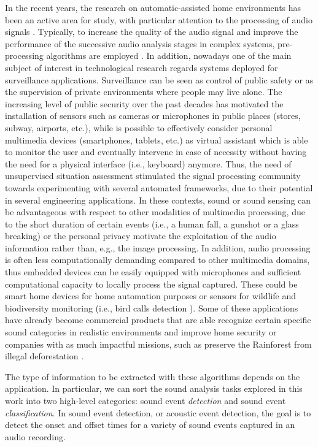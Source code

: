 In the recent years, the research on automatic-assisted home environments has been an active area for study, with particular attention to the processing of audio signals \cite{Gemmeke13,Vacher2015,Principi2015a}. Typically, to increase the quality of the audio signal and improve the performance of the successive audio analysis stages in complex systems, pre-processing algorithms are employed \cite{loizou2013speech,Hussain2007,Rotili12b}. In addition, nowadays one of the main subject of interest in technological research regards systems deployed for surveillance applications. Surveillance can be seen as control of public safety or as the supervision of private environments where people may live alone.  The increasing level of public security over the past decades has motivated the installation of sensors such as cameras or microphones in public places (stores, subway, airports, etc.), while is possible to effectively consider personal multimedia devices (smartphones, tablets, etc.) as virtual assistant which is able to monitor the user and eventually intervene in case of necessity without having the need for a physical interface (i.e., keyboard) anymore.
Thus, the need of unsupervised situation assessment stimulated the signal processing community towards experimenting with several automated frameworks, due to their potential in several engineering applications.
In these contexts, sound or sound sensing can be advantageous with respect to other modalities of multimedia processing, due to the short duration of certain events (i.e., a human fall, a gunshot or a glass breaking) or the personal privacy motivate the exploitation of the audio information rather than, e.g., the image processing. 
In addition, audio processing is often less computationally demanding compared to other multimedia domains, thus embedded devices can be easily equipped with microphones and sufficient computational capacity to locally process the signal captured. 
These could be smart home devices for home automation purposes or sensors for wildlife and biodiversity monitoring (i.e., bird calls detection \cite{grill2017two}). 
Some of these applications have already become commercial products that are able recognize certain specific sound categories in realistic environments and improve home security \cite{audioanalytic}  or companies with as much impactful missions, such as preserve the Rainforest from illegal deforestation \cite{rainforest}.

The type of information to be extracted with these algorithms depends on the application. In particular, we can sort the sound analysis tasks explored in this work into two high-level categories: sound event \textit{detection} and sound event \textit{classification}.
In sound event detection, or acoustic event detection, the goal is to detect the onset and offset times for a variety of sound events captured in an audio recording. 


